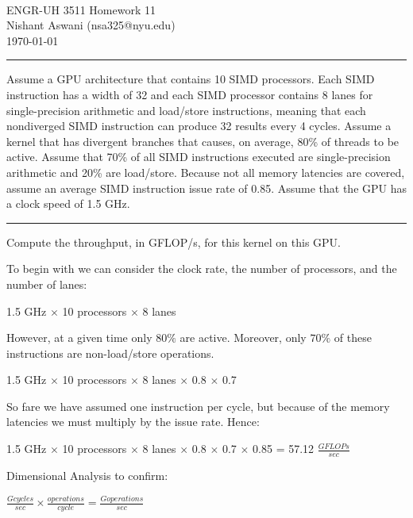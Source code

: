 \documentclass[11pt]{exam}
\makeatletter
\newcommand{\myname}{Nishant Aswani}
\newcommand{\myemail}{nsa325@nyu.edu}
\newcommand{\myhwtype}{Homework}
\newcommand{\myhwnum}{11}
\newcommand{\mycoursenumber}{ENGR-UH 3511}
\newcounter{questionCounter}
\newcounter{partCounter}[questionCounter]
\newenvironment{namedquestion}[1]{%
    \addtocounter{questionCounter}{1}%
    \setcounter{partCounter}{0}%
    \vspace{.2in}%
        \noindent{\bf #1}%
    \vspace{0.3em} \hrule \vspace{.1in}%
}{}
\makeatother
\begin{document}
\

{\newpage}


\thispagestyle{plain}
\begin{center}
  {\Large \mycoursenumber{} \myhwtype{} \myhwnum} \\
  \myname{} (\myemail{}) \\
  \today
\end{center}

\setcounter{questionCounter}{0}

\begin{namedquestion}{Case 4.13}
Assume a GPU architecture that contains 10 SIMD processors. Each SIMD instruction has a width of 32 and each SIMD processor contains 8 lanes for single-precision arithmetic and load/store instructions, meaning that each nondiverged SIMD instruction can produce 32 results every 4 cycles. Assume a kernel that has divergent branches that causes, on average, 80\% of threads to be active. Assume that 70\% of all SIMD instructions executed are single-precision arithmetic and 20\% are load/store. Because not all memory latencies are covered, assume an average SIMD instruction issue rate of 0.85. Assume that the GPU has a clock speed of 1.5 GHz. 
\end{namedquestion}

\begin{namedquestion}{Problem 4.13a}
Compute the throughput, in GFLOP/s, for this kernel on this GPU. 

To begin with we can consider the clock rate, the number of processors, and the number of lanes: 

1.5 GHz $\times$ 10 processors $\times$ 8 lanes

However, at a given time only $80\%$ are active. Moreover, only $70\%$ of these instructions are non-load/store operations. 

1.5 GHz $\times$ 10 processors $\times$ 8 lanes $\times$ 0.8 $\times$ 0.7

So fare we have assumed one instruction per cycle, but because of the memory latencies we must multiply by the issue rate. Hence:

1.5 GHz $\times$ 10 processors $\times$ 8 lanes $\times$ 0.8 $\times$ 0.7 $\times$ 0.85 = 57.12 $\frac{GFLOPs}{sec}$

Dimensional Analysis to confirm: 

$\frac{G cycles}{sec} \times \frac{operations}{cycle} = \frac{G operations}{sec}$  

\end{namedquestion}
\end{document}
